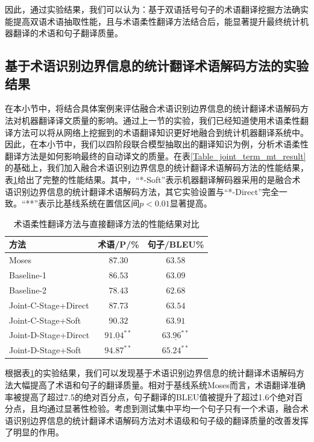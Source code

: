 因此，通过实验结果，我们可以认为：基于双语括号句子的术语翻译挖掘方法确实能提高双语术语抽取性能，且与术语柔性翻译方法结合后，能显著提升最终统计机器翻译的术语和句子翻译质量。


\subsection{基于术语识别边界信息的统计翻译术语解码方法的实验结果}

在本小节中，将结合具体案例来评估融合术语识别边界信息的统计翻译术语解码方法对机器翻译译文质量的影响。通过上一节的实验，我们已经知道使用术语柔性翻译方法可以将从网络上挖掘到的术语翻译知识更好地融合到统计机器翻译系统中。因此，在本小节中，我们以四阶段联合模型抽取出的翻译知识为例，分析术语柔性翻译方法是如何影响最终的自动译文的质量。在表\ref{Table_joint_term_mt_result}的基础上，我们加入融合术语识别边界信息的统计翻译术语解码方法的性能结果，表\ref{Table_soft_direct_result}给出了完整的性能结果。其中，“*-Soft”表示机器翻译解码器采用的是融合术语识别边界信息的统计翻译术语解码方法，其它实验设置与“*-Direct”完全一致。“**”表示比基线系统在置信区间$p<0.01$显著提高。

\begin{table}[!htbp]
	\centering
	\begin{tabular}{|l|c|c|}
		\hline
		方法  & 术语/P/\% & 句子/BLEU\% \\ 
		\hline
		Moses         & $87.30$ & $63.58$ \\ \hline
		Baseline-1    & $86.53$ & $63.09$ \\ \hline
		Baseline-2    & $78.43$ & $62.68$ \\ \hline
		Joint-C-Stage+Direct & $87.73$ & $63.54$ \\ \hline
		Joint-C-Stage+Soft & $90.32$ & $63.91$ \\ \hline
		Joint-D-Stage+Direct & $\underline{91.04^{**}}$ & $\underline{63.96^{**}}$ \\ \hline
		Joint-D-Stage+Soft & $\mathbf{94.87^{**}}$ & $\mathbf{65.24^{**}}$ \\
		\hline
	\end{tabular}
	\caption{术语柔性翻译方法与直接翻译方法的性能结果对比}
	\label{Table_soft_direct_result}
\end{table}

根据表\ref{Table_soft_direct_result}的实验结果，我们可以发现基于术语识别边界信息的统计翻译术语解码方法大幅提高了术语和句子的翻译质量。相对于基线系统Moses而言，术语翻译准确率被提高了超过7.5的绝对百分点，句子翻译的BLEU值被提升了超过1.6个绝对百分点，且均通过显著性检验。考虑到测试集中平均一个句子只有一个术语，融合术语识别边界信息的统计翻译术语解码方法对术语级和句子级的翻译质量的改善发挥了明显的作用。

